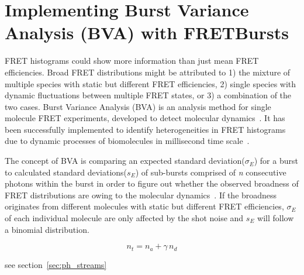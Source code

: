 \section{Implementing Burst Variance Analysis (BVA) with FRETBursts}

FRET histograms could show more information than just mean FRET efficiencies. Broad FRET distributions might be attributed to 1) the mixture of multiple species with static but different FRET efficiencies, 2) single species with dynamic fluctuations between multiple FRET states, or 3) a combination of the two cases. Burst Variance Analysis (BVA) is an analysis method for single molecule FRET experiments, developed to detect molecular dynamics~\cite{Torella_2011}. It has been successfully implemented to identify heterogeneities in FRET histograms due to dynamic processes of biomolecules in millisecond time scale~\cite{Torella_2011, Robb_2013}.

The concept of BVA is comparing an expected standard deviation($\sigma_E$) for a burst to calculated standard deviations($s_E$) of sub-bursts comprised of \textit{n} consecutive photons within the burst in order to figure out whether the observed broadness of FRET distributions are owing to the molecular dynamics~\cite{Torella_2011}. If the broadness originates from different molecules with static but different FRET efficiencies, $\sigma_E$ of each individual molecule are only affected by the shot noise and $s_E$ will follow a binomial distribution.  

$$ n_t = n_a + \gamma\,n_d$$ 

see section~\ref{sec:ph_streams}